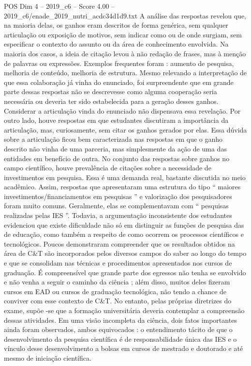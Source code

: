 \begin{textsample}{POS Dim 4 – 2019\_c6 – Score 4.00 – 2019\_c6/enade\_2019\_nutri\_acdc34d1d9.txt}
A análise das respostas revelou que, na maioria delas, os ganhos eram descritos de forma genérica, sem qualquer articulação ou exposição de motivos, sem indicar como ou de onde surgiam, sem especificar o contexto do assunto ou da área de conhecimento envolvida.
Na maioria dos casos, a ideia de citação levou à não redação de frases, mas à menção de palavras ou expressões.
Exemplos frequentes foram : aumento de pesquisa, melhoria de conteúdo, melhoria de estrutura.
Mesmo relevando a interpretação de que essa colaboração já vinha do enunciado, foi surpreendente que em grande parte dessas respostas não se descrevesse como alguma cooperação seria necessária ou deveria ter sido estabelecida para a geração desses ganhos.
Considerar a articulação vinda do enunciado não dispensava essa revelação.
Por outro lado, houve respostas em que estudantes discutiram a importância da articulação, mas, curiosamente, sem citar os ganhos gerados por elas.
Essa dúvida sobre a articulação ficou bem caracterizada nas respostas em que o ganho descrito não vinha de uma parceria, mas simplesmente da ação de uma das entidades em benefício de outra.
No conjunto das respostas sobre ganhos no campo científico, houve prevalência de citações sobre a necessidade de investimentos em pesquisa.
Essa é uma demanda real, bastante discutida no meio acadêmico.
Assim, respostas que apresentaram uma estrutura do tipo “ maiores investimentos/financiamentos em pesquisas ” e valorização dos pesquisadores foram muito comuns.
Geralmente, elas se complementavam com “ pesquisas realizadas pelas IES ”.
Todavia, a argumentação inconsistente dos estudantes evidenciou que existe dificuldade não só em distinguir as funções de pesquisa das de educação, como também a respeito de como ocorrem os processos científicos e tecnológicos.
Poucos demonstraram compreender que os resultados obtidos na área de C\&T são incorporados pelos diversos campos do saber ao longo do tempo e que se consolidam nas técnicas e procedimentos apresentados nos cursos de graduação.
É compreensível que grande parte dos egressos não tenha se envolvido e não venha a seguir o caminho da ciência ; além disso, muitos deles fizeram cursos em EAD ou cursos de graduação tecnológica, não tendo a chance de conviver com esse contexto de C\&T.
No entanto, pelas próprias diretrizes do exame, supõe -se que a formação universitária deveria contemplar a compreensão dessas atividades.
Em uma visão incompleta da ciência, dois fatos importantes ainda foram observados, ambos equivocados : o entendimento tácito de que o desenvolvimento da pesquisa científica é de responsabilidade única das IES e o vínculo desse desenvolvimento a bolsas em cursos de mestrado e doutorado e até mesmo de iniciação científica.

\end{textsample}
